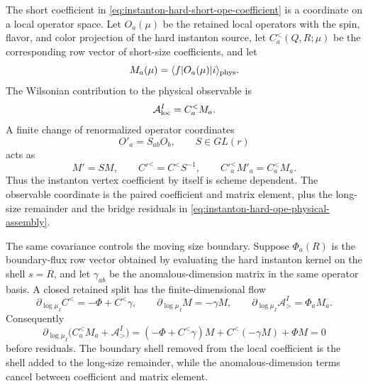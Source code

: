 \begin{controlledapproximation}
\label{ca:instanton-wilsonian-matching-covariance}
The short coefficient in
\eqref{eq:instanton-hard-short-ope-coefficient} is a coordinate on a local
operator space.  Let \(O_a(\mu)\) be the retained local operators with the
spin, flavor, and color projection of the hard instanton source, let
\(C_a^{<}(Q,R;\mu)\) be the corresponding row vector of short-size
coefficients, and let
\[
  M_a(\mu)=\langle f|O_a(\mu)|i\rangle_{\rm phys}.
\]
The Wilsonian contribution to the physical observable is
\begin{equation}
  \mathcal A_{\rm loc}^{I}
  =
  C_a^{<}M_a .
  \label{eq:instanton-wilsonian-local-pairing}
\end{equation}
A finite change of renormalized operator coordinates
\[
  O'_a=S_{ab}O_b,
  \qquad S\in GL(r)
\]
acts as
\begin{equation}
  M'=SM,\qquad C'^{<}=C^{<}S^{-1},
  \qquad
  C'^{<}_{a}M'_a=C^{<}_{a}M_a .
  \label{eq:instanton-wilsonian-scheme-covariance}
\end{equation}
Thus the instanton vertex coefficient by itself is scheme dependent.  The
observable coordinate is the paired coefficient and matrix element, plus the
long-size remainder and the bridge residuals in
\eqref{eq:instanton-hard-ope-physical-assembly}.

The same covariance controls the moving size boundary.  Suppose
\(\Phi_a(R)\) is the boundary-flux row vector obtained by evaluating the
hard instanton kernel on the shell \(s=R\), and let \(\gamma_{ab}\) be the
anomalous-dimension matrix in the same operator basis.  A closed retained
split has the finite-dimensional flow
\begin{equation}
  \partial_{\log\mu_I}C^{<}
  =
  -\Phi+C^{<}\gamma,
  \qquad
  \partial_{\log\mu_I}M
  =
  -\gamma M,
  \qquad
  \partial_{\log\mu_I}\mathcal A_{>}^{I}
  =
  \Phi_aM_a .
  \label{eq:instanton-wilsonian-covariant-boundary-flow}
\end{equation}
Consequently
\[
  \partial_{\log\mu_I}
  \bigl(C_a^{<}M_a+\mathcal A_{>}^{I}\bigr)
  =
  (-\Phi+C^{<}\gamma)M+C^{<}(-\gamma M)+\Phi M
  =
  0
\]
before residuals.  The boundary shell removed from the local coefficient is
the shell added to the long-size remainder, while the anomalous-dimension
terms cancel between coefficient and matrix element.


\end{controlledapproximation}
